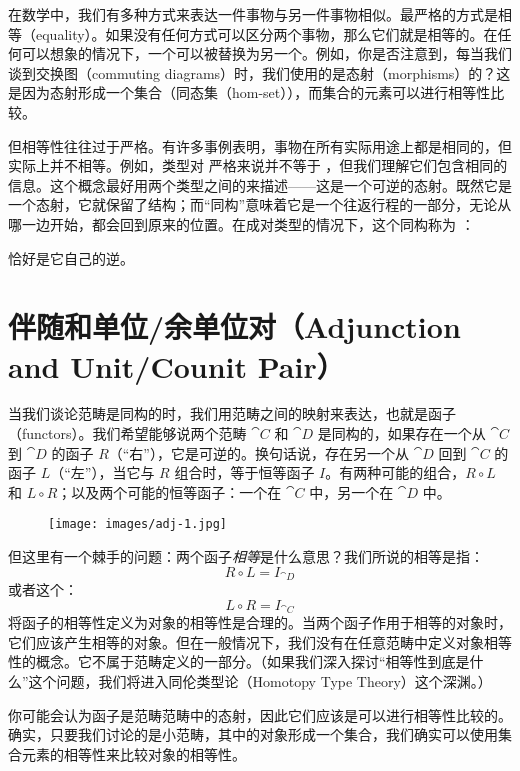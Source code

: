 
\lettrine[lhang=0.17]{在}{数学中，我们有}多种方式来表达一件事物与另一件事物相似。最严格的方式是相等（equality）。如果没有任何方式可以区分两个事物，那么它们就是相等的。在任何可以想象的情况下，一个可以被替换为另一个。例如，你是否注意到，每当我们谈到交换图（commuting diagrams）时，我们使用的是态射（morphisms）的？这是因为态射形成一个集合（同态集（hom-set）），而集合的元素可以进行相等性比较。

但相等性往往过于严格。有许多事例表明，事物在所有实际用途上都是相同的，但实际上并不相等。例如，类型对  严格来说并不等于 ，但我们理解它们包含相同的信息。这个概念最好用两个类型之间的来描述——这是一个可逆的态射。既然它是一个态射，它就保留了结构；而“同构”意味着它是一个往返行程的一部分，无论从哪一边开始，都会回到原来的位置。在成对类型的情况下，这个同构称为 ：

 恰好是它自己的逆。

\section{伴随和单位/余单位对（Adjunction and Unit/Counit Pair）}

当我们谈论范畴是同构的时，我们用范畴之间的映射来表达，也就是函子（functors）。我们希望能够说两个范畴 $\cat{C}$ 和 $\cat{D}$ 是同构的，如果存在一个从 $\cat{C}$ 到 $\cat{D}$ 的函子 $R$（“右”），它是可逆的。换句话说，存在另一个从 $\cat{D}$ 回到 $\cat{C}$ 的函子 $L$（“左”），当它与 $R$ 组合时，等于恒等函子 $I$。有两种可能的组合，$R \circ L$ 和 $L \circ R$；以及两个可能的恒等函子：一个在 $\cat{C}$ 中，另一个在 $\cat{D}$ 中。

\begin{figure}[H]
  \centering
  \texttt{[image: images/adj-1.jpg]}
\end{figure}

\noindent
但这里有一个棘手的问题：两个函子\emph{相等}是什么意思？我们所说的相等是指：
\[R \circ L = I_{\cat{D}}\]
或者这个：
\[L \circ R = I_{\cat{C}}\]
将函子的相等性定义为对象的相等性是合理的。当两个函子作用于相等的对象时，它们应该产生相等的对象。但在一般情况下，我们没有在任意范畴中定义对象相等性的概念。它不属于范畴定义的一部分。（如果我们深入探讨“相等性到底是什么”这个问题，我们将进入同伦类型论（Homotopy Type Theory）这个深渊。）

你可能会认为函子是范畴范畴中的态射，因此它们应该是可以进行相等性比较的。确实，只要我们讨论的是小范畴，其中的对象形成一个集合，我们确实可以使用集合元素的相等性来比较对象的相等性。

